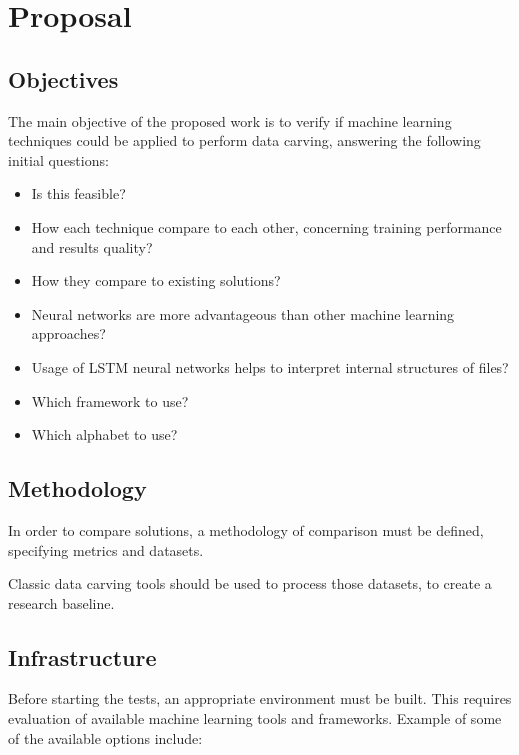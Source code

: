 \chapter{Proposal}
\section{Objectives}
The main objective of the proposed work is to verify if machine learning techniques could be applied to perform data carving, answering the following initial questions:


\begin{itemize}
  \item Is this feasible?
  \item How each technique compare to each other, concerning training performance and results quality?
  \item How they compare to existing solutions?
  \item Neural networks are more advantageous than other machine learning approaches?
  \item Usage of LSTM neural networks helps to interpret internal structures of files?
  \item Which framework to use?
  \item Which alphabet to use?
\end{itemize}

\section{Methodology}
In order to compare solutions, a methodology of comparison must be defined, specifying metrics and datasets.


Classic data carving tools should be used to process those datasets, to create a research baseline.

\section{Infrastructure}
Before starting the tests, an appropriate environment must be built. This requires evaluation of available machine learning tools and frameworks. Example of some of the available options include:

